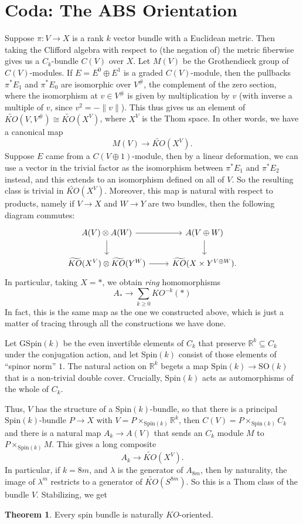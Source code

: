 \documentclass{shortart}
\theoremstyle{definition}
\newtheorem*{thm}{Theorem}
\newcommand\R{\mathbb{R}}
\newcommand\SO{\mathrm{SO}}
\newcommand\Spin{\mathrm{Spin}}
\newcommand\GSpin{\mathrm{GSpin}}
\begin{document}
\newpage
\section{Coda: The ABS Orientation}
Suppose $\pi: V \to X$ is a rank $k$ vector bundle with a Euclidean metric. Then taking the Clifford algebra with respect to (the negation of) the metric fiberwise gives us a $C_k$-bundle $C(V)$ over $X$. Let $M(V)$ be the Grothendieck group of $C(V)$-modules. If $E = E^0 \oplus E^1$ is a graded $C(V)$-module, then the pullbacks $\pi^* E_1$ and $\pi^* E_0$ are isomorphic over $V^\#$, the complement of the zero section, where the isomorphism at $v \in V^\#$ is given by multiplication by $v$ (with inverse a multiple of $v$, since $v^2 = -\|v\|$). This thus gives us an element of $\widetilde{KO}(V, V^\#) \cong \widetilde{KO}(X^V)$, where $X^V$ is the Thom space. In other words, we have a canonical map
\[
  M(V) \to \widetilde{KO}(X^V).
\]
Suppose $E$ came from a $C(V \oplus 1)$-module, then by a linear deformation, we can use a vector in the trivial factor as the isomorphism between $\pi^*E_1$ and $\pi^*E_2$ instead, and this extends to an isomorphism defined on all of $V$. So the resulting class is trivial in $\widetilde{KO}(X^V)$. Moreover, this map is natural with respect to products, namely if $V \to X$ and $W \to Y$ are two bundles, then the following diagram commutes:
\[
  \begin{tikzcd}
    A(V) \otimes A(W) \ar[d] \ar[r] & A (V \oplus W) \ar[d]\\
    \widetilde{KO}(X^V) \otimes \widetilde{KO}(Y^W) \ar[r] & \widetilde{KO}(X \times Y^{V \oplus W}).
  \end{tikzcd}
\]
In particular, taking $X = *$, we obtain \emph{ring} homomorphisms
\[
  A_* \to \sum_{k \geq 0} KO^{-k}(*)
\]
In fact, this is the same map as the one we constructed above, which is just a matter of tracing through all the constructions we have done.

Let $\GSpin(k)$ be the even invertible elements of $C_k$ that preserve $\R^k \subseteq C_k$ under the conjugation action, and let $\Spin(k)$ consist of those elements of ``spinor norm'' $1$. The natural action on $\R^k$ begets a map $\Spin(k) \to \SO(k)$ that is a non-trivial double cover. Crucially, $\Spin(k)$ acts as automorphisms of the whole of $C_k$.

Thus, $V$ has the structure of a $\Spin(k)$-bundle, so that there is a principal $\Spin(k)$-bundle $P \to X$ with $V = P \times_{\Spin(k)} \R^k$, then $C(V) = P \times_{\Spin(k)} C_k$ and there is a natural map $A_k \to A(V)$ that sends an $C_k$ module $M$ to $P \times_{\Spin(k)} M$. This gives a long composite
\[
  A_k \to \widetilde{KO}(X^V).
\]
In particular, if $k = 8m$, and $\lambda$ is the generator of $A_{8m}$, then by naturality, the image of $\lambda^m$ restricts to a generator of $\widetilde{KO}(S^{8m})$. So this is a Thom class of the bundle $V$. Stabilizing, we get

\begin{thm}
  Every spin bundle is naturally $KO$-oriented.
\end{thm}



\end{document}
